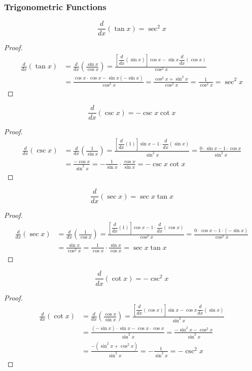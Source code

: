 \subsubsection*{Trigonometric Functions}
\[\frac{d}{dx}(\tan x)=\sec^2 x\]
\begin{proof}
    \begin{align*}
        \frac{d}{dx}(\tan x)
        &= \frac{d}{dx}\left(\frac{\sin x}{\cos x}\right)
        =\frac{\left[\dfrac{d}{dx}(\sin x)\right]\cos x
        -\sin x\dfrac{d}{dx}(\cos x)}{\cos^2 x} \\
        &= \frac{\cos x\cdot\cos x-\sin x(-\sin x)}{\cos^2 x}
        =\frac{\cos^2 x+\sin^2 x}{\cos^2 x}=\frac{1}{\cos^2 x}=\sec^2 x
    \end{align*}
\end{proof}
\[\frac{d}{dx}(\csc x)=-\csc x\cot x\]
\begin{proof}
    \begin{align*}
        \frac{d}{dx}(\csc x)
        &= \frac{d}{dx}\left(\frac{1}{\sin x}\right)
        =\frac{\left[\dfrac{d}{dx}(1)\right]\sin x
        -1\cdot\dfrac{d}{dx}(\sin x)}{\sin^2 x}
        =\frac{0\cdot\sin x-1\cdot\cos x}{\sin^2 x} \\
        &= \frac{-\cos x}{\sin^2 x}
        =-\frac{1}{\sin x}\cdot\frac{\cos x}{\sin x}=-\csc x\cot x
    \end{align*}
\end{proof}
\[\frac{d}{dx}(\sec x)=\sec x\tan x\]
\begin{proof}
    \begin{align*}
        \frac{d}{dx}(\sec x)
        &= \frac{d}{dx}\left(\frac{1}{\cos x}\right)
        =\frac{\left[\dfrac{d}{dx}(1)\right]\cos x
        -1\cdot\dfrac{d}{dx}(\cos x)}{\cos^2 x}
        =\frac{0\cdot\cos x-1\cdot(-\sin x)}{\cos^2 x} \\
        &= \frac{\sin x}{\cos^2 x}=\frac{1}{\cos x}\cdot\frac{\sin x}{\cos x}
        =\sec x\tan x
    \end{align*}
\end{proof}
\[\frac{d}{dx}(\cot x)=-\csc^2 x\]
\begin{proof}
    \begin{align*}
        \frac{d}{dx}(\cot x)
        &= \frac{d}{dx}\left(\frac{\cos x}{\sin x}\right)
        =\frac{\left[\dfrac{d}{dx}(\cos x)\right]\sin x
        -\cos x\dfrac{d}{dx}(\sin x)}{\sin^2 x} \\
        &= \frac{(-\sin x)\cdot\sin x-\cos x\cdot\cos x}{\sin^2 x}
        =\frac{-\sin^2 x-\cos^2 x}{\sin^2x} \\
        &= \frac{-(\sin^2 x+\cos^2 x)}{\sin^2 x}=-\frac{1}{\sin^2 x}=-\csc^2 x
    \end{align*}
\end{proof}